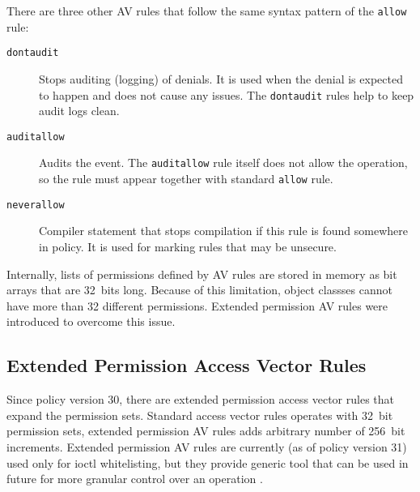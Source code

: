 There are three other AV rules that follow the same syntax pattern of the
\texttt{allow} rule:
\begin{description}
    \item [\texttt{dontaudit}] Stops auditing (logging) of denials. It is used
        when the denial is expected to happen and does not cause any issues. The
        \texttt{dontaudit} rules help to keep audit logs clean.
    \item [\texttt{auditallow}] Audits the event. The \texttt{auditallow} rule
        itself does not allow the operation, so the rule must appear together
        with standard \texttt{allow} rule.
    \item [\texttt{neverallow}] Compiler statement that stops compilation if
        this rule is found somewhere in policy. It is used for marking rules
        that may be unsecure.
\end{description}
Internally, lists of permissions defined by AV rules are stored in memory as
bit arrays that are 32~bits long. Because of this limitation, object classses
cannot have more than 32 different permissions. Extended permission AV rules
were introduced to overcome this issue.

\subsection{Extended Permission Access Vector Rules}
\label{extavrules}

Since policy version 30, there are extended permission access vector rules that
expand the permission sets. Standard access vector rules operates with 32~bit
permission sets, extended permission AV rules adds arbitrary number of 256~bit
increments. Extended permission AV rules are currently (as of policy version 31)
used only for ioctl whitelisting, but they provide generic tool that can be used
in future for more granular control over an operation \cite{selinuxmailxperms}.

